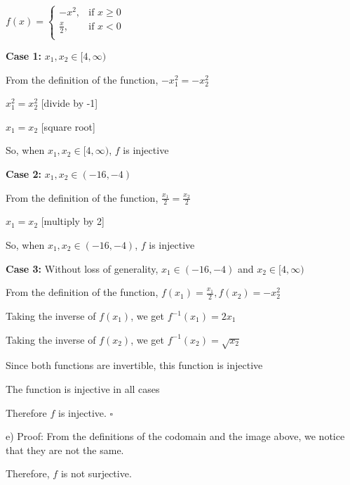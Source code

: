 \documentclass{article} %
\begin{document}
    \vspace{0.4cm}
    \tabto*{0.98cm} 
    $f(x) = \begin{cases}
        -x^2, &\text{if } x \geq 0 \\
        \frac{x}{2}, &\text{if } x < 0 \\
    \end{cases}$

    \vspace{0.4cm}
    \tabto{0.98cm} \textbf{Case 1:} $x_1, x_2 \in [4, \infty)$

    \tabto{1.5cm} From the definition of the function, $-x_1^2 = -x_2^2$

    \vspace{0.1cm}
    \tabto{7.35cm} $x_1^2 = x_2^2$ [divide by -1]

    \tabto{7.35cm} $x_1 = x_2$ [square root]

    \tabto{1.5cm} So, when $x_1, x_2 \in [4, \infty)$, $f$ is injective

    \tabto*{0.98cm} \textbf{Case 2:} $x_1, x_2 \in (-16, -4)$

    \tabto{1.5cm} From the definition of the function, $\frac{x_1}{2} = \frac{x_2}{2}$

    \tabto{7.1cm} $x_1 = x_2$ [multiply by 2]

    \tabto{1.5cm} So, when $x_1, x_2 \in (-16, -4)$, $f$ is injective

    \tabto*{0.98cm} \textbf{Case 3:} Without loss of generality, $x_1 \in (-16, -4)$ and $x_2 \in [4, \infty)$

    \tabto{1.5cm} From the definition of the function, $f(x_1) = \frac{x_1}{2}, f(x_2)=-x_2^2$

    \tabto{1.5cm} Taking the inverse of $f(x_1)$, we get $f^{-1}(x_1) = 2x_1$

    \tabto{1.5cm} Taking the inverse of $f(x_2)$, we get $f^{-1}(x_2) = \sqrt{x_2}$

    \tabto{1.5cm} Since both functions are invertible, this function is injective

    \tabto{0.98cm}The function is injective in all cases
    
    \tabto{0.98cm}Therefore $f$ is injective. $\square$
    
    e) Proof: From the definitions of the codomain and the image above, we notice that they are 
    \tabto{0.98cm}not the same.

    \tabto{0.98cm}Therefore, $f$ is not surjective.

                                                                    
\end{document}

